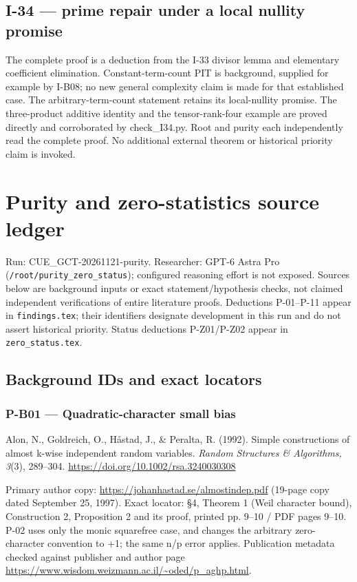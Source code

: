 \documentclass[11pt,a4paper]{article}
\theoremstyle{definition}\newtheorem{definition}{Definition}
\begin{document}
\subsection{I-34 --- prime repair under a local nullity
promise}\label{i-34--prime-repair-under-a-local-nullity-promise}

The complete proof is a deduction from the I-33 divisor lemma and
elementary coefficient elimination. Constant-term-count PIT is
background, supplied for example by I-B08; no new general complexity
claim is made for that established case. The arbitrary-term-count
statement retains its local-nullity promise. The three-product additive
identity and the tensor-rank-four example are proved directly and
corroborated by check\_I34.py. Root and purity each independently read
the complete proof. No additional external theorem or historical
priority claim is invoked.
\section{Purity and zero-statistics source
ledger}\label{purity-and-zero-statistics-source-ledger}

Run: CUE\_GCT-20261121-purity. Researcher: GPT-6 Astra Pro
(\nolinkurl{/root/purity_zero_status}); configured reasoning effort is
not exposed. Sources below are background inputs or exact
statement/hypothesis checks, not claimed independent verifications of
entire literature proofs. Deductions P-01--P-11 appear in
\nolinkurl{findings.tex}; their identifiers designate development in this
run and do not assert historical priority. Status deductions P-Z01/P-Z02
appear in \nolinkurl{zero_status.tex}.

\subsection{Background IDs and exact
locators}\label{background-ids-and-exact-locators}

\subsubsection{P-B01 --- Quadratic-character small
bias}\label{p-b01--quadratic-character-small-bias}

Alon, N., Goldreich, O., Håstad, J., \& Peralta, R. (1992). Simple
constructions of almost k-wise independent random variables.
\emph{Random Structures \& Algorithms, 3}(3), 289--304.
\url{https://doi.org/10.1002/rsa.3240030308}

Primary author copy: \url{https://johanhastad.se/almostindep.pdf}
(19-page copy dated September 25, 1997). Exact locator: §4, Theorem 1
(Weil character bound), Construction 2, Proposition 2 and its proof,
printed pp. 9--10 / PDF pages 9--10. P-02 uses only the monic squarefree
case, and changes the arbitrary zero-character convention to +1; the
same n/p error applies. Publication metadata checked against publisher
and author page
\url{https://www.wisdom.weizmann.ac.il/~oded/p_aghp.html}.
\end{document}
